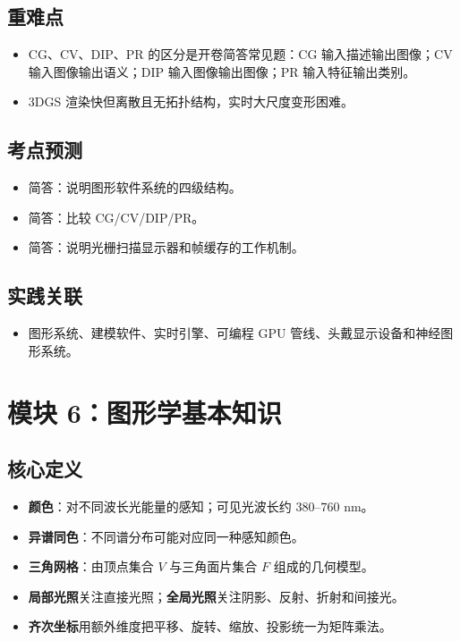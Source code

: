 \documentclass[UTF8,zihao=-4,scheme=chinese,fontset=fandol]{ctexart}
\newcommand{\key}[1]{\textbf{#1}}
\begin{document}
\subsection{重难点}
\begin{itemize}
  \item CG、CV、DIP、PR 的区分是开卷简答常见题：CG 输入描述输出图像；CV 输入图像输出语义；DIP 输入图像输出图像；PR 输入特征输出类别。
  \item 3DGS 渲染快但离散且无拓扑结构，实时大尺度变形困难。
\end{itemize}

\subsection{考点预测}
\begin{itemize}
  \item 简答：说明图形软件系统的四级结构。
  \item 简答：比较 CG/CV/DIP/PR。
  \item 简答：说明光栅扫描显示器和帧缓存的工作机制。
\end{itemize}

\subsection{实践关联}
\begin{itemize}
  \item 图形系统、建模软件、实时引擎、可编程 GPU 管线、头戴显示设备和神经图形系统。
\end{itemize}

\section{模块 6：图形学基本知识}

\subsection{核心定义}
\begin{itemize}
  \item \key{颜色}：对不同波长光能量的感知；可见光波长约 $380$--$760$ nm。
  \item \key{异谱同色}：不同谱分布可能对应同一种感知颜色。
  \item \key{三角网格}：由顶点集合 $V$ 与三角面片集合 $F$ 组成的几何模型。
  \item \key{局部光照}关注直接光照；\key{全局光照}关注阴影、反射、折射和间接光。
  \item \key{齐次坐标}用额外维度把平移、旋转、缩放、投影统一为矩阵乘法。
\end{itemize}
\end{document}
